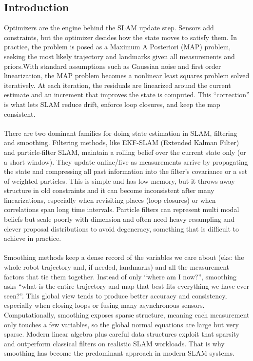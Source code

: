 \subsection{Introduction}
Optimizers are the engine behind the SLAM update step. Sensors add constraints, but the optimizer decides how the state moves to satisfy them. In practice, the problem is posed as a Maximum A Posteriori (MAP) problem, seeking the most likely trajectory and landmarks given all measurements and priors.With standard assumptions such as Gaussian noise and first order linearization, the MAP problem becomes a nonlinear least squares problem solved iteratively. At each iteration, the residuals are linearized around the current estimate and an increment that improves the state is computed. This ``correction'' is what lets SLAM reduce drift, enforce loop closures, and keep the map consistent. \cite{SLAM_part_present_future}
\\ \\
There are two dominant families for doing state estimation in SLAM, filtering and smoothing. Filtering methods, like EKF-SLAM (Extended Kalman Filter) and particle-filter SLAM, maintain a rolling belief over the current state only (or a short window). They update online/live as measurements arrive by propagating the state and compressing all past information into the filter's covariance or a set of weighted particles. This is simple and has low memory, but it throws away structure in old constraints and it can become inconsistent after many linearizations, especially when revisiting places (loop closures) or when correlations span long time intervals. Particle filters can represent multi modal beliefs but scale poorly with dimension and often need heavy resampling and clever proposal distributions to avoid degeneracy, something that is difficult to achieve in practice. \cite{SLAM_tutorial_part_1}\cite{SLAM_tutorial_part_2}
\\ \\
Smoothing methods keep a dense record of the variables we care about (eks: the whole robot trajectory and, if needed, landmarks) and all the measurement factors that tie them together. Instead of only ``where am I now?'', smoothing asks ``what is the entire trajectory and map that best fits everything we have ever seen?''. This global view tends to produce better accuracy and consistency, especially when closing loops or fusing many asynchronous sensors. Computationally, smoothing exposes sparse structure, meaning each measurement only touches a few variables, so the global normal equations are large but very sparse. Modern linear algebra plus careful data structures exploit that sparsity and outperform classical filters on realistic SLAM workloads. That is why smoothing has become the predominant approach in modern SLAM systems.

